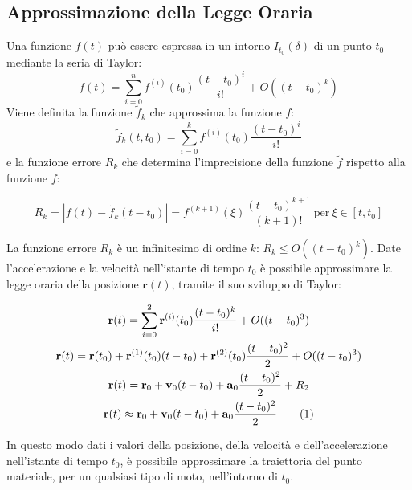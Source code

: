\documentclass{article}
\newcommand{\vect}[1]{\boldsymbol{\mathbf{#1}}}
\numberwithin{equation}{subsection}
\begin{document}
\subsection{Approssimazione della Legge Oraria} 
Una funzione $f(t)$ può essere espressa in un intorno $I_{t_0}(\delta)$ 
di un punto $t_0$ mediante la seria di Taylor: 
\begin{equation}
    f(t)=\sum_{i=0}^{n}\displaystyle f^{(i)}(t_0)\frac{(t-t_0)^{i}}{i!}+O((t-t_0)^{k})
\end{equation}
Viene definita la funzione $\tilde{f}_k$ che approssima la funzione $f$:
\begin{equation}
\tilde{f}_k(t,t_0)=\sum_{i=0}^{k}\displaystyle f^{(i)}(t_0)\frac{(t-t_0)^{i}}{i!}
\end{equation}
e la funzione 
errore $R_k$ che determina l'imprecisione della funzione $\tilde{f}$ 
rispetto alla funzione $f$: 

\begin{equation}
    R_k=\displaystyle\left|f(t)-\tilde{f}_k(t-t_0)\right|=
    f^{(k+1)}(\xi)\frac{(t-t_0)^{k+1}}{(k+1)!}\:\mbox{per}\:
    \xi \in [t, t_0]
\end{equation}

La funzione errore $R_k$ è un infinitesimo di ordine $k$: 
$R_k \leq O((t-t_0)^{k})$.
Date l'accelerazione e la velocità nell'istante di tempo $t_0$ è possibile approssimare la legge oraria della posizione $\vect{r}(t)$, tramite il suo sviluppo di Taylor: 

\begin{gather*}
    \vect{r}(t)=\sum_{i=0}^{2}\displaystyle\vect{r}^{(i)}(t_0)\frac{(t-t_0)^k}{i!}+O((t-t_0)^{3})\\
    \vect{r}(t)=\vect{r}(t_0) + \vect{r}^{(1)}(t_0)(t-t_0)+\vect{r}^{(2)}(t_0)\displaystyle\frac{(t-t_0)^{2}}{2}+O((t-t_0)^{3})\\
    {\vect{r}}(t)=\vect{r}_0+\vect{v}_0(t-t_0)+\vect{a}_0\displaystyle\frac{(t-t_0)^{2}}{2}+R_2\\
    {\vect{r}}(t)\approx\vect{r}_0+\vect{v}_0(t-t_0)+\vect{a}_0\displaystyle\frac{(t-t_0)^{2}}{2}\tag{\stepcounter{equation}\theequation}
\end{gather*}

In questo modo dati i valori della posizione, della velocità 
e dell'accelerazione nell'istante di tempo $t_0$, è possibile 
approssimare la traiettoria del punto materiale, per un qualsiasi tipo di moto, nell'intorno di $t_0$.

\clearpage
\end{document}
